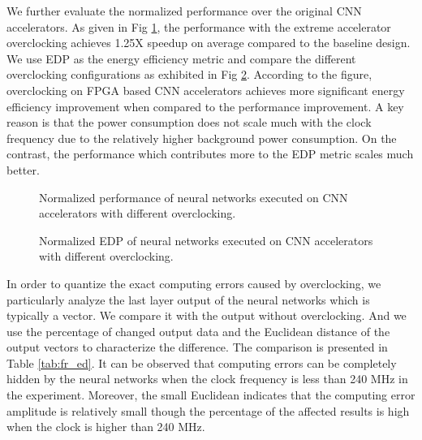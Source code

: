 We further evaluate the normalized performance over the original CNN accelerators.
As given in Fig \ref{fig:relative_time_overclock}, the performance with the extreme accelerator 
overclocking achieves 1.25X speedup on average compared to the baseline design. 
We use EDP as the energy efficiency metric and compare the 
different overclocking configurations as exhibited in Fig \ref{fig:relative_energy_overclock}.
According to the figure, overclocking on FPGA based CNN 
accelerators achieves more significant energy efficiency improvement when 
compared to the performance improvement. A key reason is that 
the power consumption does not scale much with the clock frequency due to the 
relatively higher background power consumption. On the contrast, 
the performance which contributes more to the EDP metric scales 
much better. 

\begin{figure}
    \caption{Normalized performance of neural networks executed on CNN accelerators with different overclocking.}
\label{fig:relative_time_overclock}
\vspace{-1em}
\end{figure}

\begin{figure}
    \caption{Normalized EDP of neural networks executed on CNN accelerators with different overclocking.}
\label{fig:relative_energy_overclock}
\vspace{-1em}
\end{figure}

In order to quantize the exact computing errors caused by overclocking, we 
particularly analyze the last layer output of the neural networks which 
is typically a vector. We compare it with the output without overclocking.
And we use the percentage of changed output data and the Euclidean distance 
of the output vectors to characterize the difference. 
The comparison is presented in Table \ref{tab:fr_ed}. It can be observed that 
computing errors can be completely hidden by the neural networks when the clock 
frequency is less than 240 MHz in the experiment. Moreover, the small Euclidean indicates that 
the computing error amplitude is relatively small though the percentage of 
the affected results is high when the clock is higher than 240 MHz.

